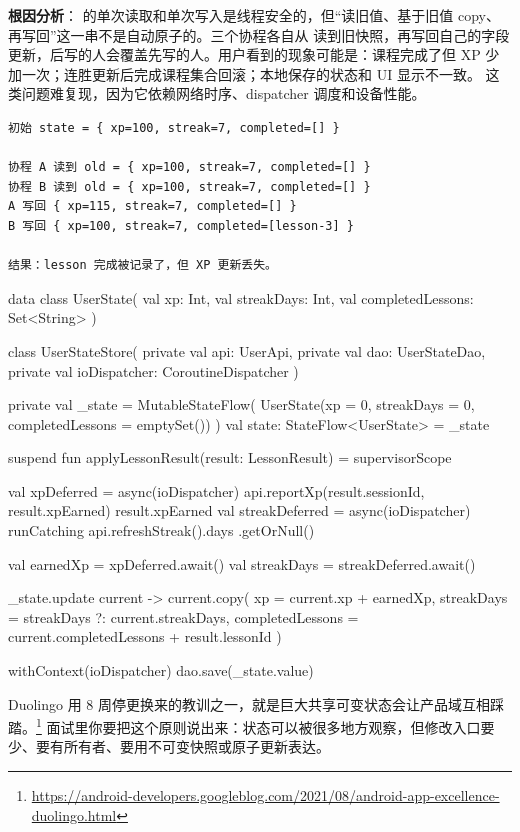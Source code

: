 \textbf{根因分析}： 的单次读取和单次写入是线程安全的，但“读旧值、基于旧值 copy、再写回”这一串不是自动原子的。三个协程各自从  读到旧快照，再写回自己的字段更新，后写的人会覆盖先写的人。用户看到的现象可能是：课程完成了但 XP 少加一次；连胜更新后完成课程集合回滚；本地保存的状态和 UI 显示不一致。 \srcinferred 这类问题难复现，因为它依赖网络时序、dispatcher 调度和设备性能。

\begin{lstlisting}
初始 state = { xp=100, streak=7, completed=[] }

协程 A 读到 old = { xp=100, streak=7, completed=[] }
协程 B 读到 old = { xp=100, streak=7, completed=[] }
A 写回 { xp=115, streak=7, completed=[] }
B 写回 { xp=100, streak=7, completed=[lesson-3] }

结果：lesson 完成被记录了，但 XP 更新丢失。
\end{lstlisting}

\begin{ktfix}
data class UserState(
    val xp: Int,
    val streakDays: Int,
    val completedLessons: Set<String>
)

class UserStateStore(
    private val api: UserApi,
    private val dao: UserStateDao,
    private val ioDispatcher: CoroutineDispatcher
) {
    private val _state = MutableStateFlow(
        UserState(xp = 0, streakDays = 0, completedLessons = emptySet())
    )
    val state: StateFlow<UserState> = _state

    suspend fun applyLessonResult(result: LessonResult) = supervisorScope {
        val xpDeferred = async(ioDispatcher) {
            api.reportXp(result.sessionId, result.xpEarned)
            result.xpEarned
        }
        val streakDeferred = async(ioDispatcher) {
            runCatching { api.refreshStreak().days }.getOrNull()
        }

        val earnedXp = xpDeferred.await()
        val streakDays = streakDeferred.await()

        _state.update { current ->
            current.copy(
                xp = current.xp + earnedXp,
                streakDays = streakDays ?: current.streakDays,
                completedLessons = current.completedLessons + result.lessonId
            )
        }

        withContext(ioDispatcher) {
            dao.save(_state.value)
        }
    }
}
\end{ktfix}

\begin{idea}
Duolingo 用 8 周停更换来的教训之一，就是巨大共享可变状态会让产品域互相踩踏。\srcofficial\footnote{\url{https://android-developers.googleblog.com/2021/08/android-app-excellence-duolingo.html}} 面试里你要把这个原则说出来：状态可以被很多地方观察，但修改入口要少、要有所有者、要用不可变快照或原子更新表达。
\end{idea}

